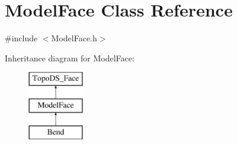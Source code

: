 \hypertarget{classModelFace}{\section{Model\-Face Class Reference}
\label{classModelFace}
}


{\ttfamily \#include $<$Model\-Face.\-h$>$}

Inheritance diagram for Model\-Face\-:\begin{figure}[H]
\begin{center}
\leavevmode
\includegraphics[height=3.000000cm]{classModelFace}
\end{center}
\end{figure}
